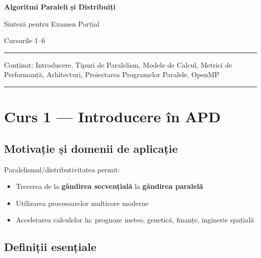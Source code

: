 \documentclass[a4paper,11pt]{article}
\begin{document}
\begin{titlepage}
  \centering
  \vspace*{2cm}
  {\Huge\bfseries\color{primary} Algoritmi Paraleli și Distribuiți \par}
  \vspace{0.5cm}
  {\Large\color{darkgray} Sinteză pentru Examen Parțial \par}
  \vspace{0.3cm}
  {\large\color{darkgray} Cursurile 1–6 \par}
  \vspace{2cm}
  \hrule
  \vspace{0.5cm}
  {\normalsize Conținut: Introducere, Tipuri de Paralelism, Modele de Calcul,
  Metrici de Performanță, Arhitecturi, Proiectarea Programelor Paralele, OpenMP \par}
  \vspace{0.5cm}
  \hrule
  \vfill
\end{titlepage}

\tableofcontents
\newpage

\section{Curs 1 — Introducere în APD}

\subsection{Motivație și domenii de aplicație}

Paralelismul/distributivitatea permit:
\begin{itemize}[noitemsep]
  \item Trecerea de la \textbf{gândirea secvențială} la \textbf{gândirea paralelă}
  \item Utilizarea procesoarelor multicore moderne
  \item Accelerarea calculelor în: prognoze meteo, genetică, finanțe, inginerie spațială
\end{itemize}

\subsection{Definiții esențiale}
\end{document}
